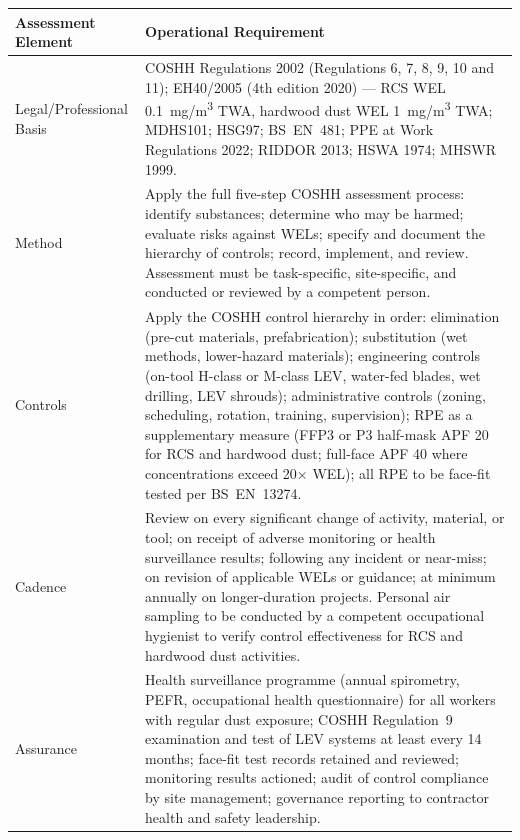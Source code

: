\begin{table}[H]
\centering
\begin{tabularx}{\textwidth}{>{\raggedright\arraybackslash}p{3.2cm}X}
\toprule
\textbf{Assessment Element} & \textbf{Operational Requirement} \\
\midrule
Legal/Professional Basis & COSHH Regulations 2002 (Regulations 6, 7, 8, 9, 10 and 11); EH40/2005 (4th edition 2020) --- RCS WEL 0.1~mg/m\textsuperscript{3} TWA, hardwood dust WEL 1~mg/m\textsuperscript{3} TWA; MDHS101; HSG97; BS~EN~481; PPE at Work Regulations 2022; RIDDOR 2013; HSWA 1974; MHSWR 1999. \\
Method & Apply the full five-step COSHH assessment process: identify substances; determine who may be harmed; evaluate risks against WELs; specify and document the hierarchy of controls; record, implement, and review. Assessment must be task-specific, site-specific, and conducted or reviewed by a competent person. \\
Controls & Apply the COSHH control hierarchy in order: elimination (pre-cut materials, prefabrication); substitution (wet methods, lower-hazard materials); engineering controls (on-tool H-class or M-class LEV, water-fed blades, wet drilling, LEV shrouds); administrative controls (zoning, scheduling, rotation, training, supervision); RPE as a supplementary measure (FFP3 or P3 half-mask APF 20 for RCS and hardwood dust; full-face APF 40 where concentrations exceed 20$\times$ WEL); all RPE to be face-fit tested per BS~EN~13274. \\
Cadence & Review on every significant change of activity, material, or tool; on receipt of adverse monitoring or health surveillance results; following any incident or near-miss; on revision of applicable WELs or guidance; at minimum annually on longer-duration projects. Personal air sampling to be conducted by a competent occupational hygienist to verify control effectiveness for RCS and hardwood dust activities. \\
Assurance & Health surveillance programme (annual spirometry, PEFR, occupational health questionnaire) for all workers with regular dust exposure; COSHH Regulation~9 examination and test of LEV systems at least every 14 months; face-fit test records retained and reviewed; monitoring results actioned; audit of control compliance by site management; governance reporting to contractor health and safety leadership. \\
\bottomrule
\end{tabularx}
\end{table}

